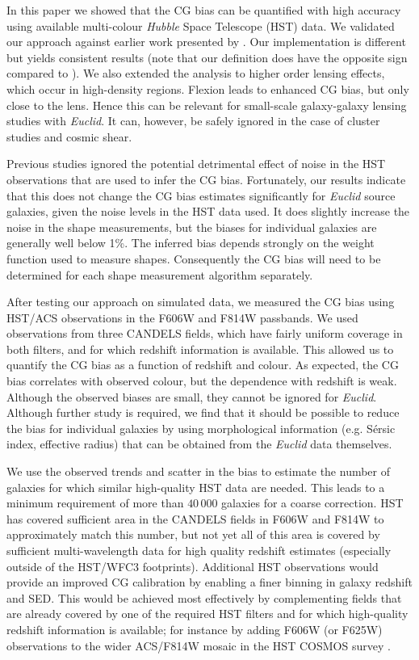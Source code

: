 \documentclass[useAMS,usenatbib]{mnras}
\begin{document}
In this paper we showed that the CG bias can be quantified with high accuracy using available multi-colour {\it Hubble} Space Telescope (HST) data. We validated our approach against earlier work presented by
. Our implementation is different but yields consistent results (note that our definition does have the opposite sign compared to ). We also extended the analysis to higher order lensing effects, which occur in high-density regions. Flexion leads to enhanced CG bias, but only close to the lens. Hence this can be relevant for small-scale galaxy-galaxy lensing studies with {\it Euclid}. It can, however, be safely ignored in the case of cluster studies and cosmic shear.

Previous studies ignored the potential detrimental effect of noise in the HST observations that are used to infer the CG bias. Fortunately, our results indicate that this does not change the CG bias estimates significantly for {\it Euclid} source galaxies, given the noise levels in the HST data used. It does slightly increase the noise in the shape measurements, but the biases for individual galaxies are generally well below 1\%.
The inferred bias depends strongly on the weight function used to measure shapes. Consequently the CG bias will need to be determined for each shape measurement algorithm separately.

After testing our approach on simulated data, we measured the CG bias using HST/ACS observations
in the F606W and F814W passbands. We used observations from three CANDELS fields, which have
fairly uniform coverage in both filters, and for which redshift information is available. This allowed us to quantify the CG bias as a function of redshift and colour. As expected, the CG bias correlates with observed colour, but the dependence with redshift is weak. Although the observed biases are small, they cannot be ignored for {\it Euclid}. Although further study is required, we find that it should be possible to reduce the bias for individual galaxies by using morphological information (e.g. S{\'e}rsic index, effective radius) that can be obtained from the {\it Euclid} data themselves.

We use the observed trends and scatter in the bias to estimate the number of galaxies for which similar high-quality HST data are needed. This leads to a minimum requirement of more than $40\,000$ galaxies for a coarse correction. HST has covered sufficient area in the CANDELS fields in F606W and
F814W to approximately match this number, but not yet all of this area is covered by sufficient
multi-wavelength data for high quality redshift estimates (especially outside of the HST/WFC3 footprints). Additional HST observations would provide an improved CG calibration by enabling a
finer binning in galaxy redshift and SED. This would be achieved most effectively by complementing
fields that are already covered by one of the required HST filters and for which high-quality redshift information is available; for instance by adding F606W (or F625W) observations to the wider ACS/F814W
mosaic in the HST COSMOS survey \citep{scoville07hst}.
\end{document}
